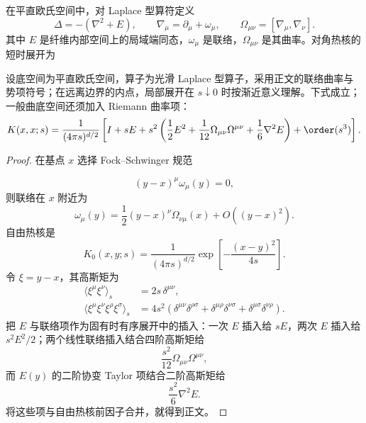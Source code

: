 在平直欧氏空间中，对 Laplace 型算符定义
\begin{equation}
 {
 \Delta=-\left(\nabla^2+E\right),
 \qquad
 \nabla_\mu=\partial_\mu+\omega_\mu,
 \qquad
 \Omega_{\mu\nu}=[\nabla_\mu,\nabla_\nu].}
 \label{eq:laplace-type-operator-dp11}
\end{equation}
其中 \(E\) 是纤维内部空间上的局域端同态，\(\omega_\mu\) 是联络，\(\Omega_{\mu\nu}\) 是其曲率。对角热核的短时展开为


\begin{proposition}
设底空间为平直欧氏空间，算子为光滑 Laplace 型算子，采用正文的联络曲率与势项符号；在远离边界的内点，局部展开在 $s\downarrow0$ 时按渐近意义理解。下式成立；一般曲底空间还须加入 Riemann 曲率项：
\begin{equation}
 {
 K(x,x;s)
 =\frac1{(4\pi s)^{d/2}}
 \left[
 I+sE+s^2\left(
 \frac12E^2+\frac1{12}\Omega_{\mu\nu}\Omega^{\mu\nu}
 +\frac16\nabla^2E
 \right)+\order(s^3)
 \right].}
\label{eq:heat-kernel-a4-flat-dp11}
\end{equation}
\end{proposition}
\begin{proof}
在基点 $x$ 选择 Fock--Schwinger 规范

\begin{equation*}
 (y-x)^\mu\omega_\mu(y)=0,
\end{equation*}
则联络在 $x$ 附近为
\begin{equation*}
 \omega_\mu(y)
 =\frac12(y-x)^\nu\Omega_{\nu\mu}(x)
 +O((y-x)^2).
\end{equation*}
自由热核是
\begin{equation*}
 K_0(x,y;s)=\frac1{(4\pi s)^{d/2}}
 \exp\!\left[-\frac{(x-y)^2}{4s}\right].
\end{equation*}
令 $\xi=y-x$，其高斯矩为
\begin{align*}
 \langle\xi^\mu\xi^\nu\rangle_s
 &=2s\,\delta^{\mu\nu},\\
 \langle\xi^\mu\xi^\nu\xi^\rho\xi^\sigma\rangle_s
 &=4s^2(\delta^{\mu\nu}\delta^{\rho\sigma}
 +\delta^{\mu\rho}\delta^{\nu\sigma}
 +\delta^{\mu\sigma}\delta^{\nu\rho}).
\end{align*}
把 $E$ 与联络项作为固有时有序展开中的插入：一次 $E$ 插入给 $sE$，两次 $E$ 插入给 $s^2E^2/2$；两个线性联络插入结合四阶高斯矩给
\begin{equation*}
 \frac{s^2}{12}\Omega_{\mu\nu}\Omega^{\mu\nu},
\end{equation*}
而 $E(y)$ 的二阶协变 Taylor 项结合二阶高斯矩给
\begin{equation*}
 \frac{s^2}{6}\nabla^2E.
\end{equation*}
将这些项与自由热核前因子合并，就得到正文。
\end{proof}

